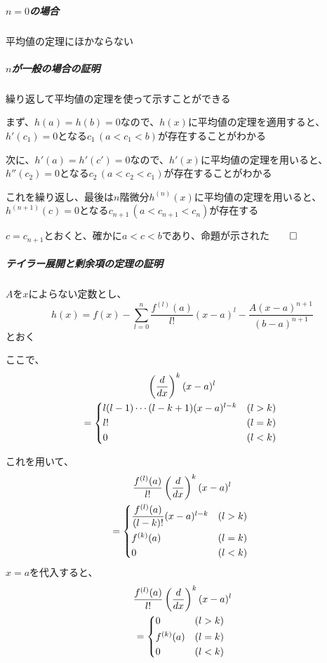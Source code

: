 \documentclass[../book_jiriki_calc]{subfiles}
\begin{document}
\subparagraph{$n=0$の場合}

平均値の定理にほかならない

\subparagraph{$n$が一般の場合の証明}

繰り返して平均値の定理を使って示すことができる

\br

まず、$h(a)=h(b)=0$なので、$h(x)$に平均値の定理を適用すると、$h'(c_1)=0$となる$c_1 \, (a < c_1 < b)$が存在することがわかる

\br

次に、$h'(a)=h'(c')=0$なので、$h'(x)$に平均値の定理を用いると、$h''(c_2)=0$となる$c_2 \, (a < c_2 < c_1)$が存在することがわかる

\br

これを繰り返し、最後は$n$階微分$h^{(n)}(x)$に平均値の定理を用いると、$h^{(n+1)}(c)=0$となる$c_{n+1}\, (a < c_{n+1} < c_n)$が存在する

$c=c_{n+1}$とおくと、確かに$a < c <b$であり、命題が示された$\qed$

\sectionline

\subparagraph{テイラー展開と剰余項の定理の証明}\quad

$A$を$x$によらない定数とし、
\begin{equation*}
  h(x) = f(x) - \sum_{l=0}^{n} \dfrac{f^{(l)}(a)}{l!}(x-a)^l - \dfrac{A(x-a)^{n+1}}{(b-a)^{n+1}}
\end{equation*}
とおく

\br

ここで、
\begin{multline}
  \left(\dfrac{d}{dx}\right)^k(x-a)^l \\ = \begin{cases*}
    l(l-1)\cdots (l-k+1)(x-a)^{l-k} & $(l>k)$ \\
    l!                              & $(l=k)$ \\
    0                               & $(l<k)$
  \end{cases*}
\end{multline}

\br

これを用いて、
\begin{multline}
  \dfrac{f^{(l)}(a)}{l!}\left(\dfrac{d}{dx}\right)^k (x-a)^l \\ = \begin{cases*}
    \dfrac{f^{(l)}(a)}{(l-k)!}(x-a)^{l-k} & $(l>k)$ \\
    f^{(k)}(a)                            & $(l=k)$ \\
    0                                     & $(l<k)$
  \end{cases*}
\end{multline}
$x=a$を代入すると、
\begin{multline*}
  \dfrac{f^{(l)}(a)}{l!}\left(\dfrac{d}{dx}\right)^k (x-a)^l \\ = \begin{cases*}
    0          & $(l>k)$ \\
    f^{(k)}(a) & $(l=k)$ \\
    0          & $(l<k)$
  \end{cases*}
\end{multline*}
\end{document}
